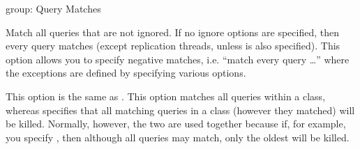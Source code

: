 \documentclass[letterpaper,10pt,english]{sphinxmanual}
\begin{document}
\begin{fulllineitems}
\label{\detokenize{mariadb-kill:cmdoption-mariadb-kill-match-all}}
group: Query Matches

Match all queries that are not ignored.  If no ignore options are specified,
then every query matches (except replication threads, unless
{\hyperref[\detokenize{mariadb-kill:cmdoption-mariadb-kill-replication-threads}]{}} is also specified).  This option allows you to
specify negative matches, i.e. “match every query …” where the
exceptions are defined by specifying various  options.

This option is  the same as {\hyperref[\detokenize{mariadb-kill:cmdoption-mariadb-kill-victims}]{}} .  This option matches
all queries within a class, whereas {\hyperref[\detokenize{mariadb-kill:cmdoption-mariadb-kill-victims}]{}}  specifies that all
matching queries in a class (however they matched) will be killed.  Normally,
however, the two are used together because if, for example, you specify
{\hyperref[\detokenize{mariadb-kill:cmdoption-mariadb-kill-victims}]{}} , then although all queries may match, only the oldest
will be killed.

\end{fulllineitems}

\end{document}
